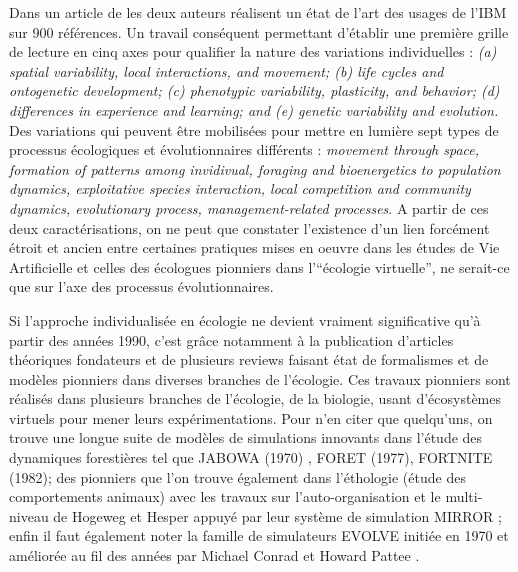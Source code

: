 Dans un article de \textcite{DeAngelis2005} les deux auteurs réalisent un état de l'art des usages de l'IBM sur 900 références. Un travail conséquent permettant d'établir une première grille de lecture en cinq axes pour qualifier la nature des variations individuelles : \textit{(a) spatial variability, local interactions, and movement; (b) life cycles and ontogenetic development; (c) phenotypic variability, plasticity, and behavior; (d) differences in experience and learning; and (e) genetic variability and evolution.} Des variations qui peuvent être mobilisées pour mettre en lumière sept types de processus écologiques et évolutionnaires différents : \textit{movement through space, formation of patterns among invidivual, foraging and bioenergetics to population dynamics, exploitative species interaction, local competition and community dynamics, evolutionary process, management-related processes}. A partir de ces deux caractérisations, on ne peut que constater l'existence d'un lien forcément étroit \autocite{Dorin2008} et ancien \autocites{Hogeweg1988, Hogeweg1990, DeAngelis2014} entre certaines pratiques mises en oeuvre dans les études de Vie Artificielle et celles des écologues pionniers dans l'\enquote{écologie virtuelle}, ne serait-ce que sur l'axe des processus évolutionnaires.

Si l'approche individualisée en écologie ne devient vraiment significative qu'à partir des années 1990, c'est grâce notamment à la publication d'articles théoriques fondateurs \autocite{Huston1988} et de plusieurs reviews faisant état de formalismes \autocite{Hogeweg1988} et de modèles pionniers \autocites{Hogeweg1990, DeAngelis1992, Judson1994} dans diverses branches de l'écologie. Ces travaux pionniers sont réalisés dans plusieurs branches de l'écologie, de la biologie, usant d'écosystèmes virtuels pour mener leurs expérimentations. Pour n'en citer que quelqu'uns, on trouve une longue suite de modèles de simulations innovants dans l'étude des dynamiques forestières \autocite{Bugmann2001} tel que JABOWA (1970) \autocite{Botkin1972}, FORET (1977), FORTNITE (1982); des pionniers que l'on trouve également dans l'éthologie (étude des comportements animaux) avec les travaux sur l'auto-organisation et le multi-niveau de Hogeweg et Hesper appuyé par leur système de simulation MIRROR \autocites{Hogeweg1979, Hogeweg1981, Hogeweg1983}; enfin il faut également noter la famille de simulateurs EVOLVE initiée en 1970 et améliorée au fil des années par Michael Conrad et Howard Pattee \autocites{Conrad1970, Pattee2002}.

